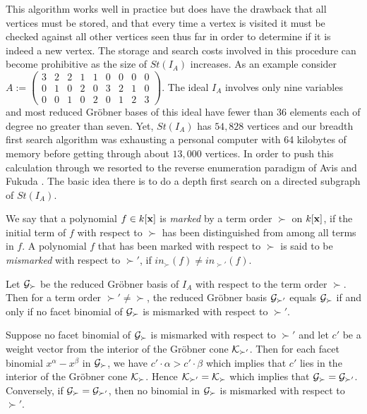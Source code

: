\documentclass[11pt]{article}
\begin{document}
This algorithm works well in practice but does have the drawback that all 
vertices must be stored, and that every time a vertex is visited it must 
be checked against all other vertices seen thus far in order to
determine if it is indeed a new vertex. The storage and search
costs involved in this procedure can become prohibitive as the size of
$St(I_A)$ increases. As an example consider 
$A := \left( \begin{array}{ccccccccc} 
         3 & 2 & 2 & 1 & 1 & 0 & 0 & 0 & 0 \\
         0 & 1 & 0 & 2 & 0 & 3 & 2 & 1 & 0 \\
         0 & 0 & 1 & 0 & 2 & 0 & 1 & 2 & 3 
\end{array} \right )$. The ideal $I_A$ involves only nine variables 
and most reduced Gr\"obner bases of this ideal have fewer than
$36$ elements each of degree no greater than seven. Yet, $St(I_A)$ has
$54,828$ vertices and our breadth first search algorithm was exhausting
a personal computer with 64 kilobytes of memory before getting through about
$13,000$ vertices. In order to push this calculation through we
resorted to the reverse enumeration paradigm of Avis and Fukuda
\cite{AF}. The basic idea there is to do a depth first search on a directed
subgraph of $St(I_A)$.  

We say that a polynomial $f \in k[{\bf x}]$ is {\em marked} by a 
term order $\succ$ on $k[{\bf x}]$, if the initial term of $f$ 
with respect to $\succ$ has been distinguished from among all terms in
$f$. A polynomial $f$ that has been marked with respect to $\succ$ is
said to be {\em mismarked} with respect to $\succ'$, 
if $in_{\succ}(f) \neq in_{\succ'}(f)$.

\begin{lemma} \label{marking}
Let ${\cal G}_{\succ}$ be the reduced Gr\"obner basis of $I_A$ with respect
to the term order $\succ$. Then for a term order $\succ' \neq
\succ$, the reduced Gr\"obner basis ${\cal G}_{\succ'}$ equals ${\cal
G}_{\succ}$ if and only if no facet 
binomial of ${\cal G}_{\succ}$ is mismarked with respect to $\succ'$.
\end{lemma}

 Suppose no facet binomial of ${\cal G}_{\succ}$
is mismarked with respect to $\succ'$ and let $c'$ be a weight vector
from the interior of the Gr\"obner cone ${\cal K}_{\succ'}$. Then for
each facet binomial $x^{\alpha} - x^{\beta}$ in ${\cal G}_{\succ}$, we
have $c' \cdot \alpha > c' \cdot \beta$
which implies that $c'$ lies in the interior of the Gr\"obner cone
${\cal K}_{\succ}$. Hence ${\cal K}_{\succ'} = {\cal K}_{\succ}$ which
implies that ${\cal G}_{\succ} = {\cal G}_{\succ'}$. Conversely, if 
${\cal G}_{\succ} = {\cal G}_{\succ'}$, then no binomial in ${\cal
G}_{\succ}$ is mismarked with respect to $\succ'$.
\end{document}
